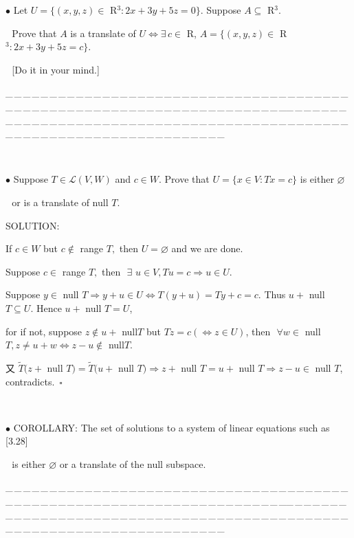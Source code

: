 \documentclass[a4paper, 11pt, UTF8]{article}
\def\Lm{\mathcal{L}}
\begin{document}
\begin{large}
{\small $\bullet$} {\timessl\Large
Let $U=\{(x,y,z)\in$ {\timesbf R}$^3:2x+3y+5z=0\}.$ Suppose $A\subseteq$ {\timesbf R}$^3$.}\par\,\,
{\timessl\Large Prove that $A$ is a translate of $U\Longleftrightarrow\exists\,c\in$ {\timesbf R}, $A=\{(x,y,z)\in$ {\timesbf R}$^3:2x+3y+5z=c\}.$}\par\,\, [{\timessl\Large Do it in your mind.}]\par
{\tiny \_\,\_\,\_\,\_\,\_\,\_\,\_\,\_\,\_\,\_\,\_\,\_\,\_\,\_\,\_\,\_\,\_\,\_\,\_\,\_\,\_\,\_\,\_\,\_\,\_\,\_\,\_\,\_\,\_\,\_\,\_\,\_\,\_\,\_\,\_\,\_\,\_\,\_\,\_\,\_\,\_\,\_\,\_\,\_\,\_\,\_\,\_\,\_\,\_\,\_\,\_\,\_\,\_\,\_\,\_\,\_\,\_\,\_\,\_\,\_\,\_\,\_\,\_\,\_\,\_\,\_\,\_\,\_\,\_\,\_\,\_\_\,\_\,\_\,\_\,\_\,\_\,\_\,\_\,\_\,\_\,\_\,\_\,\_\,\_\,\_\,\_\,\_\,\_\,\_\,\_\,\_\,\_\,\_\,\_\,\_\,\_\,\_\,\_\,\_\,\_\,\_\,\_\,\_\,\_\,\_\,\_\,\_\,\_\,\_\,\_\,\_\,\_\,\_\,\_\,\_\,\_\,\_\,\_\,\_\,\_\,\_\,\_\,\_\,\_\,\_\,\_\,\_\,\_\,\_\,\_\,\_\,\_\,\_\,\_\,\_\,\_\,\_\,\_\,\_\,\_\,\_}{\tiny\,\par}
{\small $\bullet$} {\timessl\Large Suppose $T\in\Lm(V,W)$ and $c\in W$. Prove that $U=\{x\in V:Tx=c\}$ is either $\varnothing$}\par\,\,
{\timessl\Large or is a translate of null $T$.}\par
{\timesbf S\footnotesize{OLUTION:}}\par\quad
If $c\in W$ but $c\not\in$ range $T,$ then $U=\varnothing$ and we are done.\par\quad
Suppose $c\in$ range $T,$ then $\,\,\exists\,\,u\in V,Tu=c\Rightarrow u\in U.$\par\quad
Suppose $y\in$ null $T\Rightarrow y+u\in U \Longleftrightarrow T(y+u)=Ty+c=c.$ Thus $u+$ null $T\subseteq U$. Hence $u+$ null $T=U$,\par\qquad
for if not, suppose $z\not\in u+$ null$T$ but $Tz=c(\Leftrightarrow z\in U)$, then $\,\,\forall w\in$ null $T,z\neq u+w\Leftrightarrow z-u\not\in$ null$T$.\par\qquad
又 $\tilde{T}(z+$ null $T)=\tilde{T}(u+$ null $T)\Rightarrow z+$ null $T=u+$ null $T\Rightarrow z-u\in$ null $T$, contradicts.$\,\,\,\square$\par{\tiny{\,}\par}
{\small $\bullet$}  {\timesbf C\small{OROLLARY:}} {\timessl\Large The set of solutions to a system of linear equations such as [3.28]}\par\qquad\qquad\qquad\,\,\,\,{\timessl\Large is either $\varnothing$ or a translate of the null subspace.}\par
{\tiny \_\,\_\,\_\,\_\,\_\,\_\,\_\,\_\,\_\,\_\,\_\,\_\,\_\,\_\,\_\,\_\,\_\,\_\,\_\,\_\,\_\,\_\,\_\,\_\,\_\,\_\,\_\,\_\,\_\,\_\,\_\,\_\,\_\,\_\,\_\,\_\,\_\,\_\,\_\,\_\,\_\,\_\,\_\,\_\,\_\,\_\,\_\,\_\,\_\,\_\,\_\,\_\,\_\,\_\,\_\,\_\,\_\,\_\,\_\,\_\,\_\,\_\,\_\,\_\,\_\,\_\,\_\,\_\,\_\,\_\,\_\_\,\_\,\_\,\_\,\_\,\_\,\_\,\_\,\_\,\_\,\_\,\_\,\_\,\_\,\_\,\_\,\_\,\_\,\_\,\_\,\_\,\_\,\_\,\_\,\_\,\_\,\_\,\_\,\_\,\_\,\_\,\_\,\_\,\_\,\_\,\_\,\_\,\_\,\_\,\_\,\_\,\_\,\_\,\_\,\_\,\_\,\_\,\_\,\_\,\_\,\_\,\_\,\_\,\_\,\_\,\_\,\_\,\_\,\_\,\_\,\_\,\_\,\_\,\_\,\_\,\_\,\_\,\_\,\_\,\_\,\_}{\tiny\,\par}


\end{large}
\end{document}
